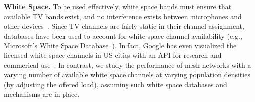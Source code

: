 {\bf White Space.} To be used effectively, white space bands must ensure that available TV bands
exist, and no interference exists between microphones and other devices~\cite{bahl2009white}. 
Since TV channels are fairly static in their channel assignment, databases have been used to 
account for white space channel availability (e.g., Microsoft's White Space Database~\cite{msdatabase}).
In fact, Google has even visualized the licensed white space channels in US cities with an API for 
research and commerical use~\cite{googledatabase}.  In contrast, we study the performance of mesh 
networks with a varying number of available white space channels at varying population densities (by 
adjusting the offered load), assuming such white space databases and mechanisms are in place.






